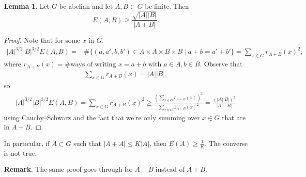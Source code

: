 \documentclass{article}
\theoremstyle{definition}
\newtheorem{lemma}[theorem]{Lemma}
\begin{document}
\begin{lemma}\label{lemma2.13}
    Let $G$ be abelian and let $A,B \subset G$ be finite. Then \[
    E(A,B) \ge \frac{\sqrt{\left|A\right|\left|B\right|}}{\left|A+B\right|}.
    \]
\end{lemma}
\begin{proof}
    Note that for some $x$ in $G$, 
    \begin{align*}
        \left|A\right|^{3/2}\left|B\right|^{3/2} E(A,B) =& \#\{(a,a',b,b') \in A \times A \times B \times B \mid a+b=a'+b'\} = \sum_{x \in G}^{} r_{A+B}(x)^2,
    \end{align*}
    where $r_{A+B}(x) = \# \text{ways of writing }x=a+b \text{ with }a \in A, b \in B$. Observe that 
    \begin{align*}
        \sum_{x \in G}^{} r_{A+B}(x) = \left|A\right|\left|B\right|,
    \end{align*}
    so \begin{align*}
        \left|A\right|^{3/2}\left|B\right|^{3/2}E(A,B) = \sum_{x \in G}^{} r_{A+B}(x)^2 \ge \frac{\left(\sum_{x \in G}^{} r_{A+B}(x)\right)^2}{\sum_{x \in G}^{} 1_{A+B}(x)^2} = \frac{(\left|A\right|\left|B\right|)^2}{\left|A+B\right|}
    \end{align*}
    using Cauchy--Schwarz and the fact that we're only summing over $x \in G$ that are in $A+B$.
\end{proof}
In particular, if $A \subset G$ such that $\left|A+A\right|\le K\left|A\right|$, then $E(A) \ge \frac{1}{K}$. The converse is not true.
\vspace{1mm}
 
\textbf{Remark.} The same proof goes through for $A-B$ instead of $A+B$.
\end{document}
